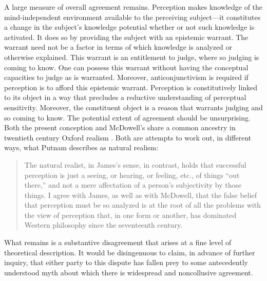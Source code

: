 \documentclass[12pt]{article}
\begin{document}
A large measure of overall agreement remains. Perception makes knowledge of the mind-inde\-pen\-dent environment available to the perceiving subject---it constitutes a change in the subject's knowledge potential whether or not such knowledge is activated. It does so by providing the subject with an epistemic warrant. The warrant need not be a factor in terms of which knowledge is analyzed or otherwise explained. This warrant is an entitlement to judge, where so judging is coming to know.  One can possess this warrant without having the conceptual capacities to judge as is warranted. Moreover, anticonjunctivism is required if perception is to afford this epistemic warrant. Perception is constitutively linked to its object in a way that precludes a reductive understanding of perceptual sensitivity. Moreover, the constituent object is a reason that warrants judging and so coming to know. The potential extent of agreement should be unsurprising. Both the present conception and McDowell's share a common ancestry in twentieth century Oxford realism \citep[see][]{Kalderon:2010fk,Marion:2000ai,Marion:2000kl}. Both are attempts to work out, in different ways, what Putnam describes as natural realism:
\begin{quote}
	The natural realist, in James's sense, in contrast, holds that successful perception is just a seeing, or hearing, or feeling, etc., of things ``out there,'' and not a mere affectation of a person's subjectivity by those things. I agree with James, as well as with McDowell, that the false belief that perception must be so analyzed is at the root of all the problems with the view of perception that, in one form or another, has dominated Western philosophy since the seventeenth century. \citep[454]{Putnam:1994kx}
\end{quote}
What remains is a substantive disagreement that arises at a fine level of theoretical description. It would be disingenuous to claim, in advance of further inquiry, that either party to this dispute has fallen prey to some antecedently understood myth about which there is widespread and noncollusive agreement.


 
 
\end{document}
